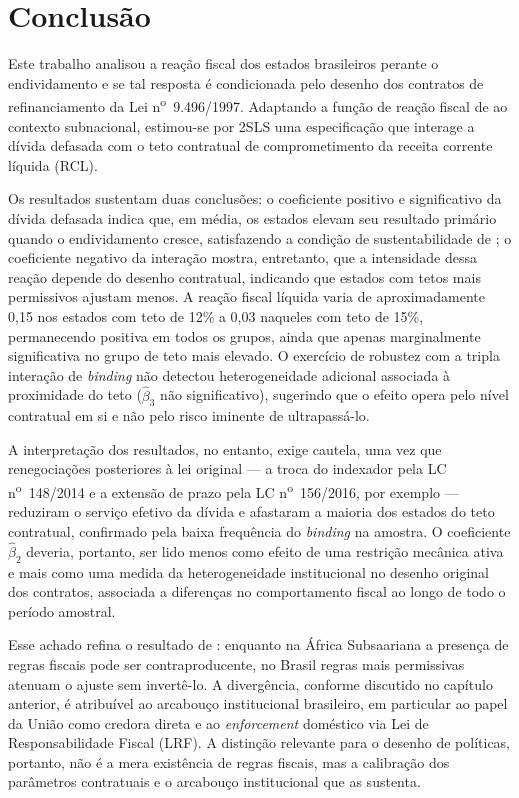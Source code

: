 \chapter{Conclusão}
\label{chap:conclusao}

Este trabalho analisou a reação fiscal dos estados brasileiros perante o endividamento e se tal resposta é condicionada pelo desenho dos contratos de refinanciamento da Lei n\textsuperscript{o}~9.496/1997. Adaptando a função de reação fiscal de  ao contexto subnacional, estimou-se por 2SLS uma especificação que interage a dívida defasada com o teto contratual de comprometimento da receita corrente líquida (RCL).

Os resultados sustentam duas conclusões: o coeficiente positivo e significativo da dívida defasada indica que, em média, os estados elevam seu resultado primário quando o endividamento cresce, satisfazendo a condição de sustentabilidade de ; o coeficiente negativo da interação mostra, entretanto, que a intensidade dessa reação depende do desenho contratual, indicando que estados com tetos mais permissivos ajustam menos. A reação fiscal líquida varia de aproximadamente 0,15 nos estados com teto de 12\% a 0,03 naqueles com teto de 15\%, permanecendo positiva em todos os grupos, ainda que apenas marginalmente significativa no grupo de teto mais elevado. O exercício de robustez com a tripla interação de \textit{binding} não detectou heterogeneidade adicional associada à proximidade do teto ($\hat{\beta}_3$ não significativo), sugerindo que o efeito opera pelo nível contratual em si e não pelo risco iminente de ultrapassá-lo.

A interpretação dos resultados, no entanto, exige cautela, uma vez que renegociações posteriores à lei original --- a troca do indexador pela LC n\textsuperscript{o}~148/2014 e a extensão de prazo pela LC n\textsuperscript{o}~156/2016, por exemplo --- reduziram o serviço efetivo da dívida e afastaram a maioria dos estados do teto contratual, confirmado pela baixa frequência do \textit{binding} na amostra. O coeficiente $\hat{\beta}_2$ deveria, portanto, ser lido menos como efeito de uma restrição mecânica ativa e mais como uma medida da heterogeneidade institucional no desenho original dos contratos, associada a diferenças no comportamento fiscal ao longo de todo o período amostral.

Esse achado refina o resultado de : enquanto na África Subsaariana a presença de regras fiscais pode ser contraproducente, no Brasil regras mais permissivas atenuam o ajuste sem invertê-lo. A divergência, conforme discutido no capítulo anterior, é atribuível ao arcabouço institucional brasileiro, em particular ao papel da União como credora direta e ao \textit{enforcement} doméstico via Lei de Responsabilidade Fiscal (LRF). A distinção relevante para o desenho de políticas, portanto, não é a mera existência de regras fiscais, mas a calibração dos parâmetros contratuais e o arcabouço institucional que as sustenta.

